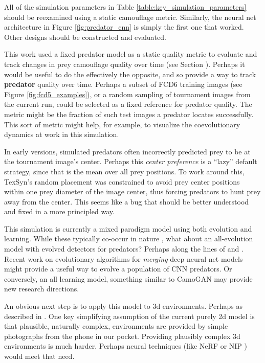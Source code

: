 \documentclass[letterpaper]{article}
\newcommand{\jargon}[1]{\textit{#1}}
\newcommand{\texsyn}[0]{TexSyn}
\begin{document}
\par
All of the simulation parameters in Table \ref{table:key_simulation_parameters} should be reexamined using a static camouflage metric. Similarly, the neural net architecture in Figure \ref{fig:predator_cnn} is simply the first one that worked. Other designs should be constructed and evaluated.
\par
This work used a fixed predator model as a static quality metric to evaluate and track changes in prey camouflage quality over time (see Section ). Perhaps it would be useful to do the effectively the opposite, and so provide a way to track \textbf{predator} quality over time. Perhaps a subset of FCD6 \citep{reynolds_FCD6_2022} training images (see Figure \ref{fig:fcd5_examples}), or a random sampling of tournament images from the current run, could be selected as a fixed reference for predator quality. The metric might be the fraction of such test images a predator locates successfully. This sort of metric might help, for example, to visualize the coevolutionary dynamics at work in this simulation.
\par
In early versions, simulated predators often incorrectly predicted prey to be at the tournament image's center. Perhaps this \jargon{center preference} is a “lazy” default strategy, since that is the mean over all prey positions. To work around this, \texsyn{}'s random placement was constrained to avoid prey center positions within one prey diameter of the image center, thus forcing predators to hunt prey away from the center. This seems like a bug that should be better understood and fixed in a more principled way.
\par
This simulation is currently a mixed paradigm model using both evolution and learning. While these typically co-occur in nature \citep{valiant_probably_2013}, what about an all-evolution model with evolved detectors for predators? Perhaps along the lines of \citet{harrington_coevolution_2014} and \citet{bi_genetic_2022}. Recent work on evolutionary algorithms for \jargon{merging} deep neural net models \citep{akiba_evolutionary_2024} might provide a useful way to evolve a population of CNN predators. Or conversely, an all learning model, something similar to CamoGAN \citep{talas_camogan_2020} may provide new research directions.
\par
An obvious next step is to apply this model to 3d environments. Perhaps as described in \citet{miller_color_2022}. One key simplifying assumption of the current purely 2d model is that plausible, naturally complex, environments are provided by simple photographs from the phone in our pocket. Providing plausibly complex 3d environments is much harder. Perhaps neural techniques (like NeRF \citep{gao_nerf_2022} or NIP \citep{sharp_spelunking_2022}) would meet that need.
\par
\end{document}
